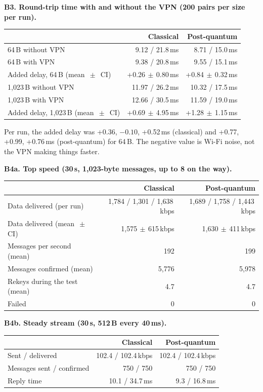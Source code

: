 \documentclass[10pt,a4paper]{article}
\newcommand{\PM}{\ensuremath{\,\pm\,}}
\begin{document}
\textbf{B3. Round-trip time with and without the VPN (200 pairs per size per run).}
\begin{table}[H]\centering\small
\begin{tabular}{lrr}
\toprule
 & Classical & Post-quantum \\
\midrule
64\,B without VPN & 9.12 / 21.8\,ms & 8.71 / 15.0\,ms \\
64\,B with VPN & 9.38 / 20.8\,ms & 9.55 / 15.1\,ms \\
Added delay, 64\,B (mean $\PM$ CI) & +0.26\PM0.80\,ms & +0.84\PM0.32\,ms \\
1,023\,B without VPN & 11.97 / 26.2\,ms & 10.32 / 17.5\,ms \\
1,023\,B with VPN & 12.66 / 30.5\,ms & 11.59 / 19.0\,ms \\
Added delay, 1,023\,B (mean $\PM$ CI) & +0.69\PM4.95\,ms & +1.28\PM1.15\,ms \\
\bottomrule
\end{tabular}
\end{table}
Per run, the added delay was +0.36, $-0.10$, +0.52\,ms (classical) and +0.77, +0.99, +0.76\,ms
(post-quantum) for 64\,B. The negative value is Wi-Fi noise, not the VPN making things faster.

\textbf{B4a. Top speed (30\,s, 1,023-byte messages, up to 8 on the way).}
\begin{table}[H]\centering\small
\begin{tabular}{lrr}
\toprule
 & Classical & Post-quantum \\
\midrule
Data delivered (per run) & 1,784 / 1,301 / 1,638\,kbps & 1,689 / 1,758 / 1,443\,kbps \\
Data delivered (mean $\PM$ CI) & 1,575\PM615\,kbps & 1,630\PM411\,kbps \\
Messages per second (mean) & 192 & 199 \\
Messages confirmed (mean) & 5,776 & 5,978 \\
Rekeys during the test (mean) & 4.7 & 4.7 \\
Failed & 0 & 0 \\
\bottomrule
\end{tabular}
\end{table}

\textbf{B4b. Steady stream (30\,s, 512\,B every 40\,ms).}
\begin{table}[H]\centering\small
\begin{tabular}{lrr}
\toprule
 & Classical & Post-quantum \\
\midrule
Sent / delivered & 102.4 / 102.4\,kbps & 102.4 / 102.4\,kbps \\
Messages sent / confirmed & 750 / 750 & 750 / 750 \\
Reply time & 10.1 / 34.7\,ms & 9.3 / 16.8\,ms \\
\bottomrule
\end{tabular}
\end{table}
\end{document}
